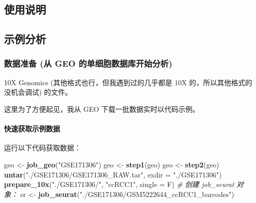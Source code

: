 \documentclass[
]{article}
\newenvironment{Shaded}{\begin{snugshade}}{\end{snugshade}}
\newcommand{\CommentTok}[1]{\textcolor[rgb]{0.56,0.35,0.01}{\textit{#1}}}
\newcommand{\DataTypeTok}[1]{\textcolor[rgb]{0.13,0.29,0.53}{#1}}
\newcommand{\KeywordTok}[1]{\textcolor[rgb]{0.13,0.29,0.53}{\textbf{#1}}}
\newcommand{\NormalTok}[1]{#1}
\newcommand{\StringTok}[1]{\textcolor[rgb]{0.31,0.60,0.02}{#1}}
\begin{document}
\hypertarget{ux4f7fux7528ux8bf4ux660e}{%
\subsection{使用说明}\label{ux4f7fux7528ux8bf4ux660e}}

\hypertarget{ux793aux4f8bux5206ux6790}{%
\subsection{示例分析}\label{ux793aux4f8bux5206ux6790}}

\hypertarget{ux6570ux636eux51c6ux5907-ux4ece-geo-ux7684ux5355ux7ec6ux80deux6570ux636eux5e93ux5f00ux59cbux5206ux6790}{%
\subsubsection{数据准备 (从 GEO 的单细胞数据库开始分析)}\label{ux6570ux636eux51c6ux5907-ux4ece-geo-ux7684ux5355ux7ec6ux80deux6570ux636eux5e93ux5f00ux59cbux5206ux6790}}

10X Genomics (其他格式也行，但我遇到过的几乎都是 10X 的，所以其他格式的没机会调试) 的文件。

这里为了方便起见，我从 GEO 下载一批数据实时以代码示例。

\hypertarget{obtain}{%
\paragraph{快速获取示例数据}\label{obtain}}

运行以下代码获取数据：

\begin{Shaded}
\begin{Highlighting}[]
\NormalTok{geo \textless{}{-}}\StringTok{ }\KeywordTok{job\_geo}\NormalTok{(}\StringTok{"GSE171306"}\NormalTok{)}
\NormalTok{geo \textless{}{-}}\StringTok{ }\KeywordTok{step1}\NormalTok{(geo)}
\NormalTok{geo \textless{}{-}}\StringTok{ }\KeywordTok{step2}\NormalTok{(geo)}
\KeywordTok{untar}\NormalTok{(}\StringTok{"./GSE171306/GSE171306\_RAW.tar"}\NormalTok{, }\DataTypeTok{exdir =} \StringTok{"./GSE171306"}\NormalTok{)}
\KeywordTok{prepare\_10x}\NormalTok{(}\StringTok{"./GSE171306/"}\NormalTok{, }\StringTok{"ccRCC1"}\NormalTok{, }\DataTypeTok{single =}\NormalTok{ F)}
\CommentTok{\# 创建 job\_seurat 对象：}
\NormalTok{sr \textless{}{-}}\StringTok{ }\KeywordTok{job\_seurat}\NormalTok{(}\StringTok{"./GSE171306/GSM5222644\_ccRCC1\_barcodes"}\NormalTok{)}
\end{Highlighting}
\end{Shaded}
\end{document}
